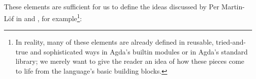 {\begin{code}%
\>[0]\AgdaSpace{}%
\AgdaSpace{}%
\<%
\\
%
\\[\AgdaEmptyExtraSkip]%
\>[0]\AgdaSpace{}%
\AgdaSpace{}%
\AgdaSymbol{\{}\AgdaSpace{}%
\AgdaSymbol{:}\AgdaSpace{}%
\AgdaSymbol{\}}\AgdaSpace{}%
\AgdaSymbol{(}\AgdaSpace{}%
\AgdaSymbol{:}\AgdaSpace{}%
\AgdaSpace{}%
\AgdaSymbol{)}\AgdaSpace{}%
\AgdaSymbol{:}\AgdaSpace{}%
\AgdaSpace{}%
\AgdaSpace{}%
\<%
\\
\>[0][@{}l@{\AgdaIndent{0}}]%
\>[2]\AgdaInductiveConstructor{[]}%
\>[7]\AgdaSymbol{:}\AgdaSpace{}%
\AgdaSpace{}%
\<%
\\
%
\>[2]\AgdaOperator{\AgdaInductiveConstructor{\AgdaUnderscore{}::\AgdaUnderscore{}}}\AgdaSpace{}%
\AgdaSymbol{:}\AgdaSpace{}%
\AgdaSpace{}%
\AgdaSpace{}%
\AgdaSpace{}%
\AgdaSpace{}%
\AgdaSpace{}%
\AgdaSpace{}%
\<%
\end{code}

These elements are sufficient for us to define the ideas discussed by Per Martin-Löf in \cite{Martin-Lof1980IntuitionisticTheory} and \cite{Martin-Lof1982ConstructiveProgramming}, for example\footnote{In reality, many of these elements are already defined in reusable, tried-and-true and sophisticated ways in Agda's builtin modules or in Agda's standard library; we merely want to give the reader an idea of how these pieces come to life from the language's basic building blocks.}:

}
